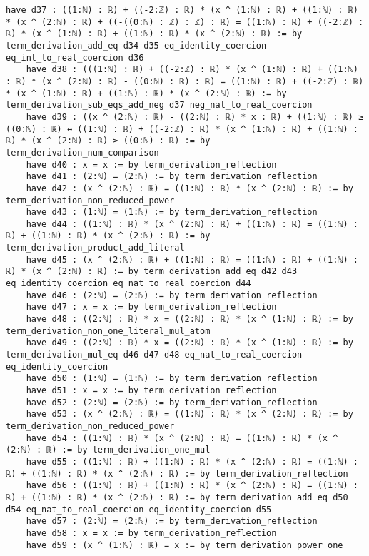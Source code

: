\documentclass{article}
\begin{document}
\begin{tcolorbox}[colback=white!10, width=\linewidth]
\begin{lstlisting}[language=Lean4]
    have d37 : ((1:ℕ) : ℝ) + ((-2:ℤ) : ℝ) * (x ^ (1:ℕ) : ℝ) + ((1:ℕ) : ℝ) * (x ^ (2:ℕ) : ℝ) + ((-((0:ℕ) : ℤ) : ℤ) : ℝ) = ((1:ℕ) : ℝ) + ((-2:ℤ) : ℝ) * (x ^ (1:ℕ) : ℝ) + ((1:ℕ) : ℝ) * (x ^ (2:ℕ) : ℝ) := by term_derivation_add_eq d34 d35 eq_identity_coercion eq_int_to_real_coercion d36
    have d38 : (((1:ℕ) : ℝ) + ((-2:ℤ) : ℝ) * (x ^ (1:ℕ) : ℝ) + ((1:ℕ) : ℝ) * (x ^ (2:ℕ) : ℝ) - ((0:ℕ) : ℝ) : ℝ) = ((1:ℕ) : ℝ) + ((-2:ℤ) : ℝ) * (x ^ (1:ℕ) : ℝ) + ((1:ℕ) : ℝ) * (x ^ (2:ℕ) : ℝ) := by term_derivation_sub_eqs_add_neg d37 neg_nat_to_real_coercion
    have d39 : ((x ^ (2:ℕ) : ℝ) - ((2:ℕ) : ℝ) * x : ℝ) + ((1:ℕ) : ℝ) ≥ ((0:ℕ) : ℝ) ↔ ((1:ℕ) : ℝ) + ((-2:ℤ) : ℝ) * (x ^ (1:ℕ) : ℝ) + ((1:ℕ) : ℝ) * (x ^ (2:ℕ) : ℝ) ≥ ((0:ℕ) : ℝ) := by term_derivation_num_comparison
    have d40 : x = x := by term_derivation_reflection
    have d41 : (2:ℕ) = (2:ℕ) := by term_derivation_reflection
    have d42 : (x ^ (2:ℕ) : ℝ) = ((1:ℕ) : ℝ) * (x ^ (2:ℕ) : ℝ) := by term_derivation_non_reduced_power
    have d43 : (1:ℕ) = (1:ℕ) := by term_derivation_reflection
    have d44 : ((1:ℕ) : ℝ) * (x ^ (2:ℕ) : ℝ) + ((1:ℕ) : ℝ) = ((1:ℕ) : ℝ) + ((1:ℕ) : ℝ) * (x ^ (2:ℕ) : ℝ) := by term_derivation_product_add_literal
    have d45 : (x ^ (2:ℕ) : ℝ) + ((1:ℕ) : ℝ) = ((1:ℕ) : ℝ) + ((1:ℕ) : ℝ) * (x ^ (2:ℕ) : ℝ) := by term_derivation_add_eq d42 d43 eq_identity_coercion eq_nat_to_real_coercion d44
    have d46 : (2:ℕ) = (2:ℕ) := by term_derivation_reflection
    have d47 : x = x := by term_derivation_reflection
    have d48 : ((2:ℕ) : ℝ) * x = ((2:ℕ) : ℝ) * (x ^ (1:ℕ) : ℝ) := by term_derivation_non_one_literal_mul_atom
    have d49 : ((2:ℕ) : ℝ) * x = ((2:ℕ) : ℝ) * (x ^ (1:ℕ) : ℝ) := by term_derivation_mul_eq d46 d47 d48 eq_nat_to_real_coercion eq_identity_coercion
    have d50 : (1:ℕ) = (1:ℕ) := by term_derivation_reflection
    have d51 : x = x := by term_derivation_reflection
    have d52 : (2:ℕ) = (2:ℕ) := by term_derivation_reflection
    have d53 : (x ^ (2:ℕ) : ℝ) = ((1:ℕ) : ℝ) * (x ^ (2:ℕ) : ℝ) := by term_derivation_non_reduced_power
    have d54 : ((1:ℕ) : ℝ) * (x ^ (2:ℕ) : ℝ) = ((1:ℕ) : ℝ) * (x ^ (2:ℕ) : ℝ) := by term_derivation_one_mul
    have d55 : ((1:ℕ) : ℝ) + ((1:ℕ) : ℝ) * (x ^ (2:ℕ) : ℝ) = ((1:ℕ) : ℝ) + ((1:ℕ) : ℝ) * (x ^ (2:ℕ) : ℝ) := by term_derivation_reflection
    have d56 : ((1:ℕ) : ℝ) + ((1:ℕ) : ℝ) * (x ^ (2:ℕ) : ℝ) = ((1:ℕ) : ℝ) + ((1:ℕ) : ℝ) * (x ^ (2:ℕ) : ℝ) := by term_derivation_add_eq d50 d54 eq_nat_to_real_coercion eq_identity_coercion d55
    have d57 : (2:ℕ) = (2:ℕ) := by term_derivation_reflection
    have d58 : x = x := by term_derivation_reflection
    have d59 : (x ^ (1:ℕ) : ℝ) = x := by term_derivation_power_one

\end{lstlisting}
\end{tcolorbox}
\end{document}
